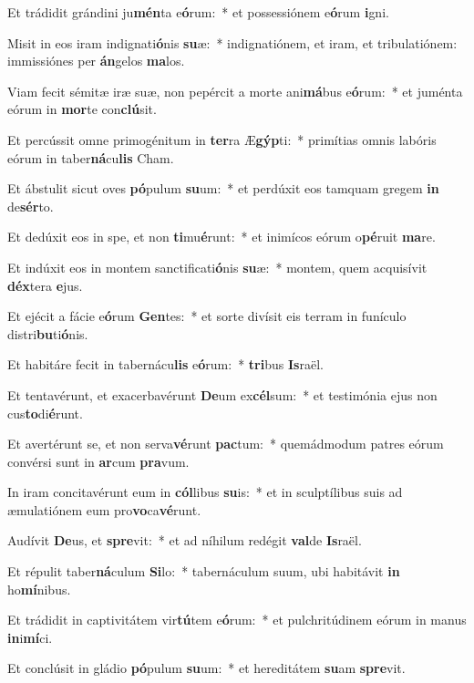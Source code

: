 \item Et trádidit grándini ju\textbf{mén}ta e\textbf{ó}rum:~* et possessiónem e\textbf{ó}rum \textbf{i}gni.
\item Misit in eos iram indignati\textbf{ó}nis \textbf{su}æ:~* indignatiónem, et iram, et tribulatiónem: immissiónes per \textbf{án}gelos \textbf{ma}los.
\item Viam fecit sémitæ iræ suæ, non pepércit a morte ani\textbf{má}bus e\textbf{ó}rum:~* et juménta eórum in \textbf{mor}te con\textbf{clú}sit.
\item Et percússit omne primogénitum in \textbf{ter}ra Æ\textbf{gýp}ti:~* primítias omnis labóris eórum in taber\textbf{ná}cu\textbf{lis} Cham.
\item Et ábstulit sicut oves \textbf{pó}pulum \textbf{su}um:~* et perdúxit eos tamquam gregem \textbf{in} de\textbf{sér}to.
\item Et dedúxit eos in spe, et non \textbf{ti}mu\textbf{é}runt:~* et inimícos eórum o\textbf{pé}ruit \textbf{ma}re.
\item Et indúxit eos in montem sanctificati\textbf{ó}nis \textbf{su}æ:~* montem, quem acquisívit \textbf{déx}tera \textbf{e}jus.
\item Et ejécit a fácie e\textbf{ó}rum \textbf{Gen}tes:~* et sorte divísit eis terram in funículo distri\textbf{bu}ti\textbf{ó}nis.
\item Et habitáre fecit in tabernácu\textbf{lis} e\textbf{ó}rum:~* \textbf{tri}bus \textbf{Is}raël.
\item Et tentavérunt, et exacerbavérunt \textbf{De}um ex\textbf{cél}sum:~* et testimónia ejus non cus\textbf{to}di\textbf{é}runt.
\item Et avertérunt se, et non serva\textbf{vé}runt \textbf{pac}tum:~* quemádmodum patres eórum convérsi sunt in \textbf{ar}cum \textbf{pra}vum.
\item In iram concitavérunt eum in \textbf{cól}libus \textbf{su}is:~* et in sculptílibus suis ad æmulatiónem eum pro\textbf{vo}ca\textbf{vé}runt.
\item Audívit \textbf{De}us, et \textbf{spre}vit:~* et ad níhilum redégit \textbf{val}de \textbf{Is}raël.
\item Et répulit taber\textbf{ná}culum \textbf{Si}lo:~* tabernáculum suum, ubi habitávit \textbf{in} ho\textbf{mí}nibus.
\item Et trádidit in captivitátem vir\textbf{tú}tem e\textbf{ó}rum:~* et pulchritúdinem eórum in manus \textbf{in}i\textbf{mí}ci.
\item Et conclúsit in gládio \textbf{pó}pulum \textbf{su}um:~* et hereditátem \textbf{su}am \textbf{spre}vit.
